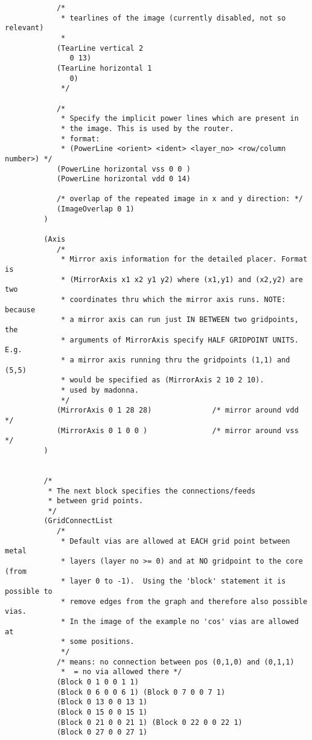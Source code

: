 {\begin{verbatim}
            /*
             * tearlines of the image (currently disabled, not so relevant)
             *
            (TearLine vertical 2
               0 13)
            (TearLine horizontal 1
               0)
             */

            /* 
             * Specify the implicit power lines which are present in
             * the image. This is used by the router.
             * format: 
             * (PowerLine <orient> <ident> <layer_no> <row/column number>) */
            (PowerLine horizontal vss 0 0 ) 
            (PowerLine horizontal vdd 0 14) 

            /* overlap of the repeated image in x and y direction: */
            (ImageOverlap 0 1)
         )

         (Axis
            /* 
             * Mirror axis information for the detailed placer. Format is
             * (MirrorAxis x1 x2 y1 y2) where (x1,y1) and (x2,y2) are two
             * coordinates thru which the mirror axis runs. NOTE: because
             * a mirror axis can run just IN BETWEEN two gridpoints, the
             * arguments of MirrorAxis specify HALF GRIDPOINT UNITS. E.g.
             * a mirror axis running thru the gridpoints (1,1) and (5,5)
             * would be specified as (MirrorAxis 2 10 2 10).
             * used by madonna.
             */
            (MirrorAxis 0 1 28 28)              /* mirror around vdd */
            (MirrorAxis 0 1 0 0 )               /* mirror around vss */
         )

 
         /*
          * The next block specifies the connections/feeds 
          * between grid points.
          */
         (GridConnectList
            /*
             * Default vias are allowed at EACH grid point between metal
             * layers (layer no >= 0) and at NO gridpoint to the core (from
             * layer 0 to -1).  Using the 'block' statement it is possible to
             * remove edges from the graph and therefore also possible vias.
             * In the image of the example no 'cos' vias are allowed at 
             * some positions.
             */
            /* means: no connection between pos (0,1,0) and (0,1,1) 
             *  = no via allowed there */
            (Block 0 1 0 0 1 1) 
            (Block 0 6 0 0 6 1) (Block 0 7 0 0 7 1)
            (Block 0 13 0 0 13 1)
            (Block 0 15 0 0 15 1)
            (Block 0 21 0 0 21 1) (Block 0 22 0 0 22 1)
            (Block 0 27 0 0 27 1)
               

\end{verbatim}}
